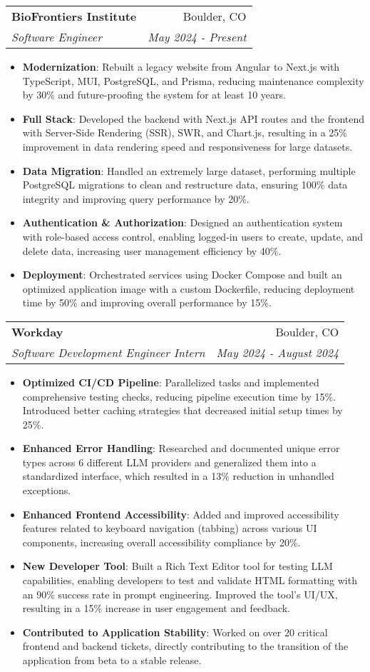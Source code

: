 \documentclass[letterpaper,11pt]{article}
\makeatletter
\newcommand{\resumeItem}[2]{
  \item\small{
    \textbf{#1}{: #2 \vspace{-2pt}}
  }
}
\newcommand{\resumeSubheading}[4]{
  \vspace{-1pt}\item
    \begin{tabular*}{0.97\textwidth}[t]{l@{\extracolsep{\fill}}r}
      \textbf{#1} & #2\vspace{-2pt} \\
      \textit{\small#3} & \textit{\small #4} \\
    \end{tabular*}\vspace{-8pt}
}
\newcommand{\resumeItemListStart}{\begin{itemize}}
\newcommand{\resumeItemListEnd}{\end{itemize}\vspace{-8pt}}
\makeatother
\begin{document}
\resumeSubheading
{BioFrontiers Institute}{Boulder, CO}
{Software Engineer}{May 2024 - Present}
\resumeItemListStart
\resumeItem{Modernization}
{Rebuilt a legacy website from Angular to Next.js with TypeScript, MUI, PostgreSQL, and Prisma, reducing maintenance complexity by 30\% and future-proofing the system for at least 10 years.}
\resumeItem{Full Stack}
{Developed the backend with Next.js API routes and the frontend with Server-Side Rendering (SSR), SWR, and Chart.js, resulting in a 25\% improvement in data rendering speed and responsiveness for large datasets.}
\resumeItem{Data Migration}
{Handled an extremely large dataset, performing multiple PostgreSQL migrations to clean and restructure data, ensuring 100\% data integrity and improving query performance by 20\%.}
\resumeItem{Authentication \& Authorization}
{Designed an authentication system with role-based access control, enabling logged-in users to create, update, and delete data, increasing user management efficiency by 40\%.}
\resumeItem{Deployment}
{Orchestrated services using Docker Compose and built an optimized application image with a custom Dockerfile, reducing deployment time by 50\% and improving overall performance by 15\%.}
\resumeItemListEnd

\resumeSubheading
{Workday}{Boulder, CO}
{Software Development Engineer Intern}{May 2024 - August 2024}
\resumeItemListStart
\resumeItem{Optimized CI/CD Pipeline}
{Parallelized tasks and implemented comprehensive testing checks, reducing pipeline execution time by 15\%. Introduced better caching strategies that decreased initial setup times by 25\%.}
\resumeItem{Enhanced Error Handling}
{Researched and documented unique error types across 6 different LLM providers and generalized them into a standardized interface, which resulted in a 13\% reduction in unhandled exceptions.}
\resumeItem{Enhanced Frontend Accessibility}
{Added and improved accessibility features related to keyboard navigation (tabbing) across various UI components, increasing overall accessibility compliance by 20\%.}
\resumeItem{New Developer Tool}
{Built a Rich Text Editor tool for testing LLM capabilities, enabling developers to test and validate HTML formatting with an 90\% success rate in prompt engineering. Improved the tool's UI/UX, resulting in a 15\% increase in user engagement and feedback.}
\resumeItem{Contributed to Application Stability}
{Worked on over 20 critical frontend and backend tickets, directly contributing to the transition of the application from beta to a stable release.}
\resumeItemListEnd
\end{document}
